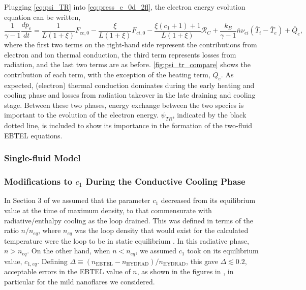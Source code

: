 
Plugging \autoref{eq:psi_TR} into \autoref{eq:press_e_0d_2fl}, the electron energy evolution equation can be written,
\begin{equation}
    \frac{1}{\gamma -1}\frac{d\bar{p}_e}{dt} = \frac{1}{L(1+\xi)}F_{ce,0} - \frac{\xi}{L(1+\xi)}F_{ci,0} - \frac{\xi(c_1+1) + 1}{L(1+\xi)}\mathcal{R}_C + \frac{k_B}{\gamma-1}\bar{n}\nu_{ei}(\bar{T}_i-\bar{T}_e) + \bar{Q}_e,
    \label{eq:press_e_0d_2fl_breakdown}
\end{equation}
where the first two terms on the right-hand side represent the contributions from electron and ion thermal conduction, the third term represents losses from radiation, and the last two terms are as before. \autoref{fig:psi_tr_compare} shows the contribution of each term, with the exception of the heating term, $\bar{Q}_e$. As expected, (electron) thermal conduction dominates during the early heating and cooling phase and losses from radiation takeover in the late draining and cooling stage. Between these two phases, energy exchange between the two species is important to the evolution of the electron energy. $\psi_{TR}$, indicated by the black dotted line, is included to show its importance in the formation of the two-fluid EBTEL equations.

\subsubsection{Single-fluid Model}\label{sec:ebtel-single-fluid}


\subsubsection{Modifications to $c_1$ During the Conductive Cooling Phase}\label{sec:c1-correction}

In Section 3 of \citet{cargill_enthalpy-based_2012} we assumed that the parameter $c_1$ decreased from its equilibrium value at the time of maximum density, to that commensurate with radiative/enthalpy cooling as the loop drained. This was defined in terms of the ratio $n/n_{eq}$, where $n_{eq}$ was the loop density that would exist for the calculated temperature were the loop to be in static equilibrium \citep[Equation 17 of][]{cargill_enthalpy-based_2012}. In this radiative phase, $n > n_{eq}$. On the other hand, when $n < n_{eq}$, we assumed $c_1$ took on its equilibrium value, $c_{1,eq}$. Defining $\Delta\equiv(n_{\mathrm{EBTEL}} - n_{\mathrm{HYDRAD}})/n_{\mathrm{HYDRAD}}$, this gave $\Delta\lesssim0.2$, acceptable errors in the EBTEL value of $n$, as shown in the figures in \citet{cargill_enthalpy-based_2012}, in particular for the mild nanoflares we considered.

